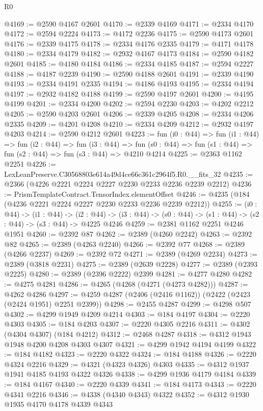\begin{lexlean}{R0}
\begin{coremodule}
@4169 := @2590 @4167 @2601
@4170 := @2339 @4169
@4171 := @2334 @4170
@4172 := @2594 @2224
@4173 := @4172 @2236
@4175 := @2590 @4173 @2601
@4176 := @2339 @4175
@4178 := @2334 @4176 @2335
@4179 := @4171 @4178
@4180 := @2334 @4179
@4182 := @2932 @4167 @4173
@4184 := @2590 @4182 @2601
@4185 := @4180 @4184
@4186 := @2334 @4185
@4187 := @2594 @2227
@4188 := @4187 @2239
@4190 := @2590 @4188 @2601
@4191 := @2339 @4190
@4193 := @2334 @4191 @2335
@4194 := @4186 @4193
@4195 := @2334 @4194
@4197 := @2932 @4182 @4188
@4199 := @2590 @4197 @2601
@4200 := @4195 @4199
@4201 := @2334 @4200
@4202 := @2594 @2230
@4203 := @4202 @2212
@4205 := @2590 @4203 @2601
@4206 := @2339 @4205
@4208 := @2334 @4206 @2335
@4209 := @4201 @4208
@4210 := @2334 @4209
@4212 := @2932 @4197 @4203
@4214 := @2590 @4212 @2601
@4223 := fun (i0 : @44) =>
  fun (i1 : @44) =>
  fun (i2 : @44) =>
  fun (i3 : @44) =>
  fun (s0 : @44) => fun (s1 : @44) => fun (s2 : @44) => fun (s3 : @44) => @4210 @4214
@4225 := @2363 @1162 @2251
@4226 := LexLeanPreserve.C30568803e614a49d4ce66c361c2964f5.R0.__fits_32
@4235 := @2366 (@4226 @2221 @2224 @2227 @2230 @2233 @2236 @2239 @2212)
@4236 := PrismTemplateContract.TensorIndex.elementOffset
@4246 := @4235 (@184 (@4236 @2221 @2224 @2227 @2230 @2233 @2236 @2239 @2212))
@4255 := (i0 : @44) ->
  (i1 : @44) ->
  (i2 : @44) -> (i3 : @44) -> (s0 : @44) -> (s1 : @44) -> (s2 : @44) -> (s3 : @44) -> @4225 @4246
@4259 := @2381 @1162 @2251 @4246 @1951
@4260 := @2392 @87
@4262 := @2389 (@4260 @2242)
@4263 := @2392 @82
@4265 := @2389 (@4263 @2240)
@4266 := @2392 @77
@4268 := @2389 (@4266 @2237)
@4269 := @2392 @72
@4271 := @2389 (@4269 @2234)
@4273 := @2389 (@3818 @2231)
@4275 := @2389 (@2639 @2228)
@4277 := @2389 (@2393 @2225)
@4280 := @2389 (@2396 @2222) @2399
@4281 := @4277 @4280
@4282 := @4275 @4281
@4286 := @4265 (@4268 (@4271 (@4273 @4282)))
@4287 := @4262 @4286
@4297 := @4259 @4287 (@2406 (@2416 @1162)) (@2422 (@2423 (@2424 @1951) @2251 @2399))
@4298 := @2455 @4287
@4299 := @4298 @507
@4302 := @4299 @1949 @4209 @4214
@4303 := @184 @4197
@4304 := @2220 @4303
@4305 := @184 @4203
@4307 := @2220 @4305 @2216
@4311 := @4302 (@4304 @4307) (@184 @4212)
@4312 := @2468 @4287
@4318 := @4312 @1943 @1948 @4200 @4208 @4303 @4307
@4321 := @4299 @1942 @4194 @4199
@4322 := @184 @4182
@4323 := @2220 @4322
@4324 := @184 @4188
@4326 := @2220 @4324 @2216
@4329 := @4321 (@4323 @4326) @4303
@4335 := @4312 @1937 @1941 @4185 @4193 @4322 @4326
@4338 := @4299 @1936 @4179 @4184
@4339 := @184 @4167
@4340 := @2220 @4339
@4341 := @184 @4173
@4343 := @2220 @4341 @2216
@4346 := @4338 (@4340 @4343) @4322
@4352 := @4312 @1930 @1935 @4170 @4178 @4339 @4343

\end{coremodule}
\end{lexlean}
